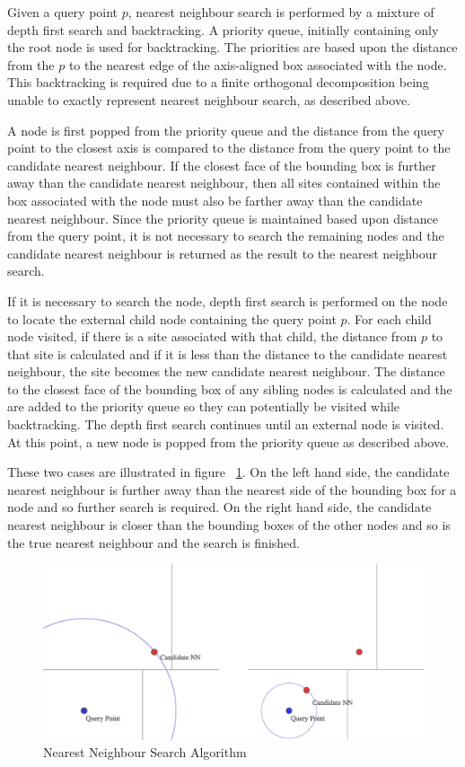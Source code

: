 \documentclass[mcs]{scsthesis}
\begin{document}
Given a query point $p$, nearest neighbour search is performed by a mixture of
depth first search and backtracking. A priority queue, initially containing only
the root node is used for backtracking. The priorities are based upon the
distance from the $p$ to the nearest edge of the axis-aligned box associated
with the node. This backtracking is required due to a finite orthogonal
decomposition being unable to exactly represent nearest neighbour search, as
described above.

A node is first popped from the priority queue and the distance from the query
point to the closest axis is compared to the distance from the query point to
the candidate nearest neighbour. If the closest face of the bounding box is
further away than the candidate nearest neighbour, then all sites contained
within the box associated with the node must also be farther away than the
candidate nearest neighbour. Since the priority queue is maintained based upon
distance from the query point, it is not necessary to search the remaining
nodes and the candidate nearest neighbour is returned as the result to the
nearest neighbour search.

If it is necessary to search the node, depth first search is performed on the
node to locate the external child node containing the query point $p$. For each
child node visited, if there is a site associated with that child, the distance
from $p$ to that site is calculated and if it is less than the distance to
the candidate nearest neighbour, the site becomes the new candidate nearest
neighbour. The distance to the closest face of the bounding box of any sibling
nodes is calculated and the are added to the priority queue so they can
potentially be visited while backtracking. The depth first search continues
until an external node is visited. At this point, a new node is popped from
the priority queue as described above.

These two cases are illustrated in figure ~\ref{fig:nn_search}. On the left hand
side, the candidate nearest neighbour is further away than the nearest side of
the bounding box for a node and so further search is required. On the right hand
side, the candidate nearest neighbour is closer than the bounding boxes of the
other nodes and so is the true nearest neighbour and the search is finished.

\begin{figure}
\begin{center}
\includegraphics[scale=0.5]{diagrams/nn_search.eps}
\caption{Nearest Neighbour Search Algorithm}
\label{fig:nn_search}
\end{center}
\end{figure}
\end{document}
